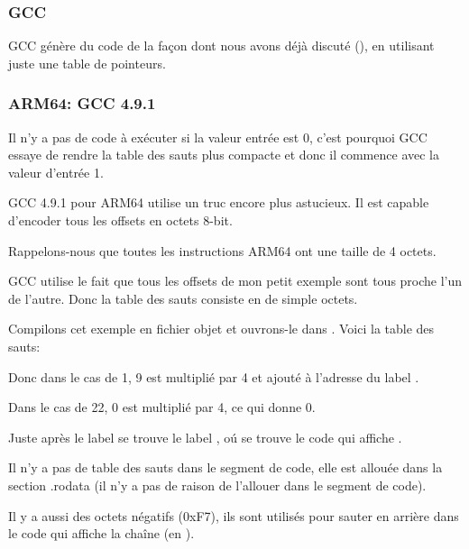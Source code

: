 \subsubsection{GCC}

GCC génère du code de la façon dont nous avons déjà discuté (),
en utilisant juste une table de pointeurs.

\subsubsection{ARM64: GCC 4.9.1 \Optimizing}

Il n'y a pas de code à exécuter si la valeur entrée est 0, c'est pourquoi GCC
essaye de rendre la table des sauts plus compacte et donc il commence avec la
valeur d'entrée 1.

GCC 4.9.1 pour ARM64 utilise un truc encore plus astucieux.
Il est capable d'encoder tous les offsets en octets 8-bit.

Rappelons-nous que toutes les instructions ARM64 ont une taille de 4 octets.

GCC utilise le fait que tous les offsets de mon petit exemple sont tous proche l'un
de l'autre. Donc la table des sauts consiste en de simple octets.



Compilons cet exemple en fichier objet et ouvrons-le dans \IDA. Voici la table des
sauts:



Donc dans le cas de 1, 9 est multiplié par 4 et ajouté à l'adresse
du label .

Dans le cas de 22, 0 est multiplié par 4, ce qui donne 0.

Juste après le label  se trouve le label , oú se trouve le code
qui affiche .

Il n'y a pas de table des sauts dans le segment de code, elle est allouée dans
la section .rodata (il n'y a pas de raison de l'allouer dans le segment de code).

Il y a aussi des octets négatifs (0xF7), ils sont utilisés pour sauter en arrière
dans le code qui affiche la chaîne (en ).

